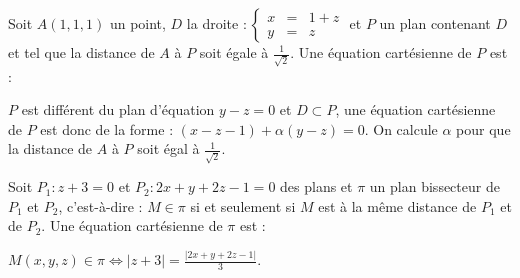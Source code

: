 \begin{question} 

Soit  $A(1,1,1)$ un point,  $D$ la droite  $ : \left\{\begin{array}{ccl}x&=&1+z\\y&=&z \end{array}\right.$ et $P$ un plan contenant $D$ et tel que la distance de $A$ à $P$ soit égale à   $\frac{1}{\sqrt 2}$. Une équation cartésienne de $P$ est :
\begin{answers}

     
 
    
   
   
\end{answers}
\begin{explanations}
$P$ est différent du plan d'équation  $y-z=0$ et $D \subset P$, une équation cartésienne de $P$ est donc de la forme : $(x-z-1)+ \alpha (y-z)=0$. On calcule $\alpha$ pour que la distance de $A$ à $P$ soit égal à $\frac{1}{\sqrt 2}$.
\end{explanations}

\end{question}


\begin{question} 

Soit  $P_1 : z+3=0$ et $P_2 : 2x+y+2z-1=0$ des plans et $\pi$  un plan bissecteur de $P_1$ et $P_2$, c'est-à-dire :   $M \in \pi$  si et seulement si $M$ est  à la même distance de $P_1$ et de  $P_2$. Une équation cartésienne de $\pi$ est : 
\begin{answers}

     
       
       
      
   
\end{answers}
\begin{explanations}
$M(x,y,z) \in \pi \Leftrightarrow |z+3|=\frac{|2x+y+2z-1|}{3}$.
\end{explanations}

\end{question}


